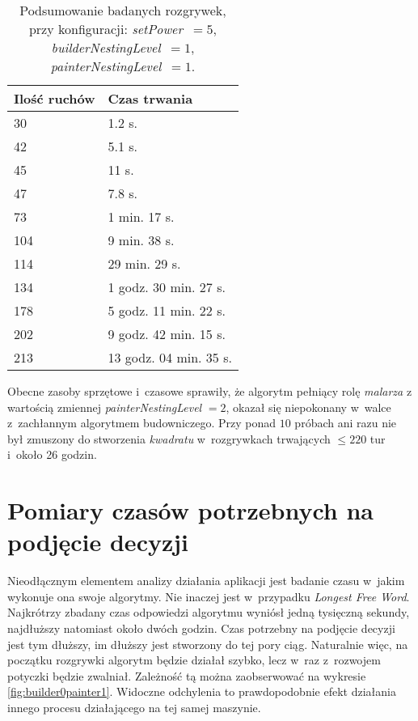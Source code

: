 \documentclass[document]{xmgr}
\begin{document}
\begin{table}[tbh]
    \centering
    	\caption{Podsumowanie badanych rozgrywek, przy konfiguracji: \emph{setPower}~$=5$, \emph{builderNestingLevel}~$=1$, \emph{painterNestingLevel}~$=1$.}
	\begin{tabular}{|p{}|p{}|} \hline
	Ilość ruchów & Czas trwania \\ \hline
	30 & 1.2 s. \\ \hline	
	42 & 5.1 s. \\ \hline
	45 & 11 s. \\ \hline	
	47 & 7.8 s. \\ \hline
	73 & 1 min. 17 s. \\ \hline
	104 & 9 min. 38 s. \\ \hline
	114 & 29 min. 29 s. \\ \hline
	134 & 1 godz. 30 min. 27 s.  \\ \hline
	178 & 5 godz. 11 min. 22 s. \\ \hline
	202 & 9 godz. 42 min. 15 s. \\ \hline
	213 & 13 godz. 04 min. 35 s. \\ \hline
	\end{tabular}
	\label{fig:builder1Painter1Table}
\end{table}


Obecne zasoby sprzętowe i~czasowe sprawiły, że algorytm pełniący rolę \emph{malarza} z wartością zmiennej \emph{painterNestingLevel} $=2$, okazał się niepokonany w~walce z~zachłannym algorytmem budowniczego. Przy ponad $10$ próbach ani razu nie był zmuszony do stworzenia \emph{kwadratu} w~rozgrywkach trwających $\leq 220$ tur i~około 26 godzin.



\section{Pomiary czasów potrzebnych na podjęcie decyzji}
Nieodłącznym elementem analizy działania aplikacji jest badanie czasu w~jakim wykonuje ona swoje algorytmy. Nie inaczej jest w~przypadku \emph{Longest Free Word}. Najkrótrzy zbadany czas odpowiedzi algorytmu wyniósł jedną tysięczną sekundy, najdłuższy natomiast około dwóch godzin. Czas potrzebny na podjęcie decyzji jest tym dłuższy, im dłuższy jest stworzony do tej pory ciąg. Naturalnie więc, na początku rozgrywki algorytm będzie działał szybko, lecz w~raz z~rozwojem potyczki będzie zwalniał. Zależność tą można zaobserwować na wykresie \ref{fig:builder0painter1}. Widoczne odchylenia to prawdopodobnie efekt działania innego procesu działającego na tej samej maszynie.
\end{document}
